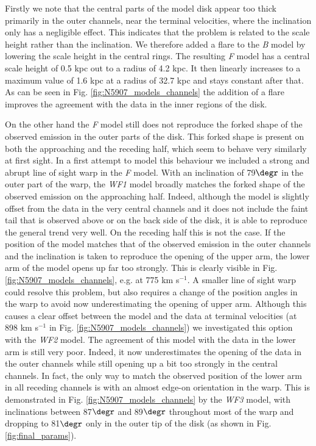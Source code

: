 \documentclass{aa}
\begin{document}
\par
Firstly we note that the central parts of the model disk appear too thick primarily in the outer channels, near the terminal velocities, where the inclination only has a negligible effect. This indicates that the problem is related to the scale height rather than the inclination. We therefore added a flare to the \emph{B} model by lowering the scale height in the central rings. The resulting \emph{F} model has a central scale height of 0.5 kpc out to a radius of 4.2 kpc. It then linearly increases to a maximum value of 1.6 kpc at a radius of 32.7 kpc and stays constant after that. As can be seen in Fig. \ref{fig:N5907_models_channels} the addition of a flare improves the agreement with the data in the inner regions of the disk.
\par
On the other hand the \emph{F} model still does not reproduce the forked shape of the observed emission in the outer parts of the disk. This forked shape is present on both the approaching and the receding half, which seem to behave very similarly at first sight. In a first attempt to model this behaviour we included a strong and abrupt line of sight warp in the \emph{F} model. With an inclination of 79$\degr$ in the outer part of the warp, the \emph{WF1} model broadly matches the forked shape of the observed emission on the approaching half. Indeed, although the model is slightly offset from the data in the very central channels and it does not include the faint tail that is observed above or on the back side of the disk, it is able to reproduce the general trend very well. On the receding half this is not the case. If the position of the model matches that of the observed emission in the outer channels and the inclination is taken to reproduce the opening of the upper arm, the lower arm of the model opens up far too strongly. This is clearly visible in Fig. \ref{fig:N5907_models_channels}, e.g. at 775 km s$^{-1}$. A smaller line of sight warp could resolve this problem, but also requires a change of the position angles in the warp to avoid now underestimating the opening of upper arm. Although this causes a clear offset between the model and the data at terminal velocities (at 898 km s$^{-1}$ in Fig. \ref{fig:N5907_models_channels}) we investigated this option with the \emph{WF2} model. The agreement of this model with the data in the lower arm is still very poor. Indeed, it now underestimates the opening of the data in the outer channels while still opening up a bit too strongly in the central channels. In fact, the only way to match the observed position of the lower arm in all receding channels is with an almost edge-on orientation in the warp. This is demonstrated in Fig. \ref{fig:N5907_models_channels} by the \emph{WF3} model, with inclinations between 87$\degr$ and 89$\degr$ throughout most of the warp and dropping to 81$\degr$ only in the outer tip of the disk (as shown in Fig. \ref{fig:final_params}). 
\end{document}
